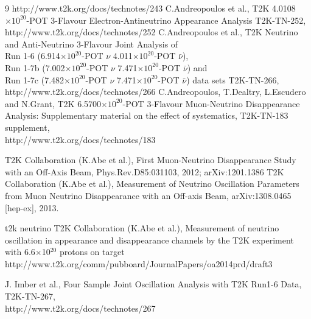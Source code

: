 \begin{thebibliography}{9}
   http://www.t2k.org/docs/technotes/243
   C.Andreopoulos et al.,
   T2K 4.0108$\times10^{20}$-POT 3-Flavour Electron-Antineutrino Appearance Analysis
   T2K-TN-252,\\
   http://www.t2k.org/docs/technotes/252
   C.Andreopoulos et al.,
   T2K Neutrino and Anti-Neutrino 3-Flavour Joint Analysis of  \\
   Run 1-6  (6.914$\times10^{20}$-POT $\nu$ 4.011$\times10^{20}$-POT $\bar{\nu}$), \\
   Run 1-7b (7.002$\times10^{20}$-POT $\nu$ 7.471$\times10^{20}$-POT $\bar{\nu}$) and \\
   Run 1-7c (7.482$\times10^{20}$-POT $\nu$ 7.471$\times10^{20}$-POT $\bar{\nu}$)
   data sets
   T2K-TN-266,\\
   http://www.t2k.org/docs/technotes/266
%
%
  C.Andreopoulos, T.Dealtry, L.Escudero and N.Grant,
  T2K 6.5700$\times10^{20}$-POT 3-Flavour Muon-Neutrino Disappearance Analysis:
  Supplementary material on the effect of systematics,
  T2K-TN-183 supplement,\\
  http://www.t2k.org/docs/technotes/183

%
%
   T2K Collaboration (K.Abe et al.), 
   First Muon-Neutrino Disappearance Study with an Off-Axis Beam,
   Phys.Rev.D85:031103, 2012; arXiv:1201.1386
  T2K Collaboration (K.Abe et al.),
  Measurement of Neutrino Oscillation Parameters from Muon Neutrino Disappearance with an Off-axis Beam,
  arXiv:1308.0465 [hep-ex], 2013.
  
%
%
t2k neutrino
   T2K Collaboration (K.Abe et al.),
   Measurement of neutrino oscillation in appearance and disappearance channels by the T2K experiment with 
   6.6$\times$10$^{20}$ protons on target 
   http://www.t2k.org/comm/pubboard/JournalPapers/oa2014prd/draft3

%
%
J. Imber et al.,
Four Sample Joint Oscillation Analysis with T2K Run1-6 Data,
  T2K-TN-267,\\
 http://www.t2k.org/docs/technotes/267


\end{thebibliography}
